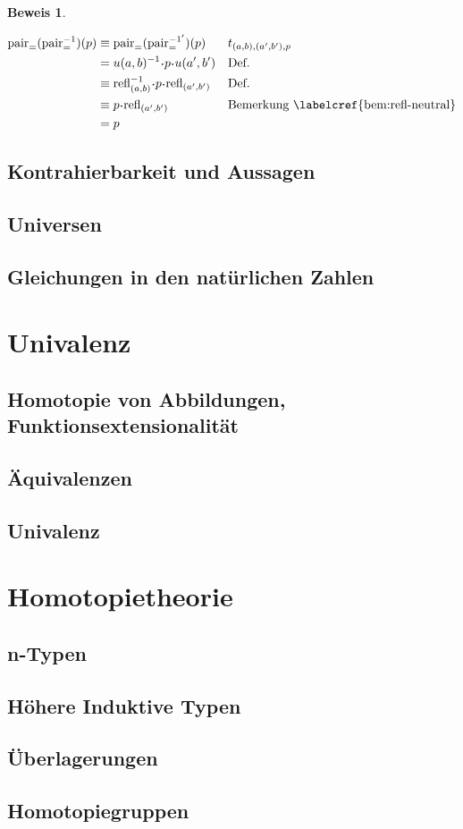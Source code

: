 \documentclass[a4paper,12pt]{article}
\theoremstyle{break}
\theoremstyle{nonumberbreak}
\theoremstyle{nonumberplain}
\newtheorem{beweis}{Beweis}
\begin{document}
\begin{beweis}
\begin{enumerate}
\begin{align*}
      \pair_=(\pair_=^{-1})(p)&\equiv \pair_=(\pair_=^{-1'})(p)& & t_{(a,b),(a',b'),p} \\
                              & =u(a,b)^{-1}\kon p\kon u(a',b') & & \text{Def.} \\
                              & \equiv \refl_{(a,b)}^{-1}\kon p\kon \refl_{(a',b')} & & \text{Def.} \\
                              & \equiv p\kon\refl_{(a',b')}& & \text{Bemerkung \labelcref{bem:refl-neutral}}\\
                              & = p & &
    \end{align*}
  \end{enumerate}
\end{beweis}
\subsection{Kontrahierbarkeit und Aussagen}
\subsection{Universen}
\subsection{Gleichungen in den natürlichen Zahlen}

\section{Univalenz}
\subsection{Homotopie von Abbildungen, Funktionsextensionalität}
\subsection{Äquivalenzen}
\subsection{Univalenz}

\section{Homotopietheorie}
\subsection{n-Typen}
\subsection{Höhere Induktive Typen}
\subsection{Überlagerungen}
\subsection{Homotopiegruppen}

\printindex
\end{document}
